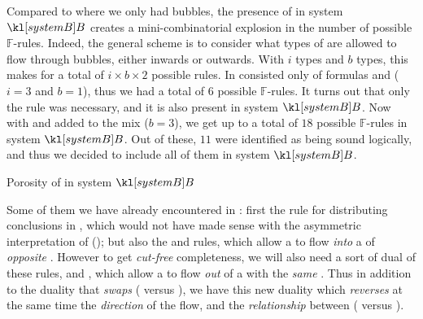 \begin{description}
  Compared to  where we only had  bubbles, the presence of
    in system $\sysB$ creates a mini-combinatorial explosion in
  the number of possible $\mathbb{F}$-rules. Indeed, the general scheme is to
  consider what types of  are allowed to flow through bubbles, either
  inwards or outwards. With $i$  types and $b$  types, this makes for
  a total of $i \times b \times 2$ possible rules. In   consisted
  only of  formulas and   ($i = 3$ and $b = 1$), thus we
  had a total of $6$ possible $\mathbb{F}$-rules. It turns out that only the
   rule was necessary, and it is also present in system
  $\sysB$. Now with  and   added to the mix ($b = 3$), we
  get up to a total of $18$ possible $\mathbb{F}$-rules in system $\sysB$. Out
  of these, $11$ were identified as being sound logically, and thus we decided
  to include all of them in system $\sysB$.

  \begin{marginfigure}
    \caption{Porosity of  in system $\sysB$}
  \end{marginfigure}
  
  Some of them we have already encountered in : first the
   rule for distributing conclusions in , which
  would not have made sense with the asymmetric interpretation of 
  (); but also the  and
   rules, which allow a   to flow
  \emph{into} a  of \emph{opposite} . However to get
  \emph{cut-free} completeness, we will also need a sort of dual of these rules,
   and , which allow a 
   to flow \emph{out} of a  with the \emph{same} . Thus in
  addition to the duality that \emph{swaps} 
  ( versus ), we have this new
  duality which \emph{reverses} at the same time the \emph{direction} of the
  flow, and the \emph{relationship} between 
  ( versus ).


\end{description}

